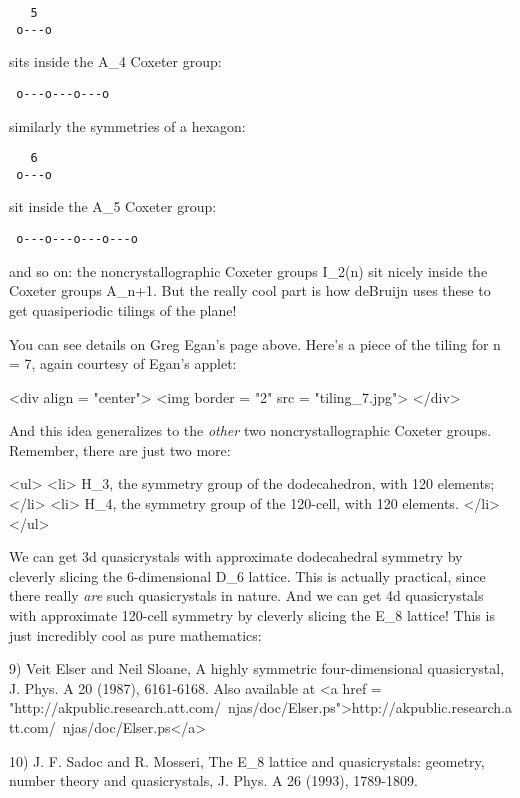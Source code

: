 \begin{verbatim}
   5
 o---o
\end{verbatim}
    
sits inside the A_{4} Coxeter group:

\begin{verbatim}
 o---o---o---o
\end{verbatim}
    
similarly the symmetries of a hexagon:

\begin{verbatim}
   6
 o---o  
\end{verbatim}
    
sit inside the A_{5} Coxeter group:

\begin{verbatim}
 o---o---o---o---o
\end{verbatim}
    
and so on: the noncrystallographic Coxeter groups I_{2}(n)
sit nicely inside the Coxeter groups A_{n+1}.  But the really
cool part is how deBruijn uses these to get quasiperiodic tilings of
the plane!  

You can see details on Greg Egan's page above.  
Here's a piece of the tiling for n = 7, again courtesy of Egan's
applet:

<div align = "center">
<img border = "2" src = "tiling_7.jpg">
</div>

And this idea generalizes to the \emph{other} two
noncrystallographic Coxeter groups.  Remember, there are just two
more:

<ul>
<li>
H_{3}, the symmetry group of the dodecahedron, with 120 elements;
</li>
<li>
H_{4}, the symmetry group of the 120-cell, with 120  elements.
</li>
</ul>

We can get 3d quasicrystals with approximate dodecahedral symmetry by
cleverly slicing the 6-dimensional D_{6} lattice.  This is
actually practical, since there really \emph{are} such quasicrystals
in nature.  And we can get 4d quasicrystals with approximate 120-cell
symmetry by cleverly slicing the E_{8} lattice!  This is just
incredibly cool as pure mathematics:

9) Veit Elser and Neil Sloane, A highly symmetric four-dimensional
quasicrystal, J. Phys. A 20 (1987), 6161-6168.
Also available at <a href = "http://akpublic.research.att.com/~njas/doc/Elser.ps">http://akpublic.research.att.com/~njas/doc/Elser.ps</a>  

10) J. F. Sadoc and R. Mosseri, The E_{8} lattice and
quasicrystals: geometry, number theory and quasicrystals, J. Phys. A
26 (1993), 1789-1809.

